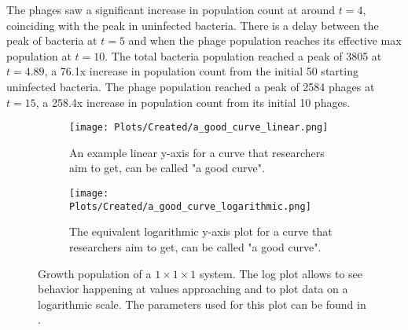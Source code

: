 The phages saw a significant increase in population count at around $t=4$, coinciding with the peak in uninfected bacteria. 
There is a delay between the peak of bacteria at $t=5$ and when the phage population reaches its effective max population at $t=10$. 
The total bacteria population reached a peak of 3805 at $t=4.89$, a 76.1x increase in population count from the initial 50 starting uninfected bacteria. 
The phage population reached a peak of 2584 phages at $t=15$, a 258.4x increase in population count from its initial 10 phages. 
\begin{figure}[h!]
    \centering
    \begin{subfigure}{1\linewidth}
        \centering
        \captionsetup{width=1\linewidth}
        \texttt{[image: Plots/Created/a\_good\_curve\_linear.png]}
        \caption{
            An example linear y-axis for a curve that researchers aim to get, can be called "a good curve". 
        }
        \label{fig:created:a_good_curve_linear}
    \end{subfigure}
    \hfill
    \begin{subfigure}{1\linewidth}
        \centering
        \captionsetup{width=1\linewidth}
        \texttt{[image: Plots/Created/a\_good\_curve\_logarithmic.png]}
        \caption{
            The equivalent logarithmic y-axis plot for a curve that researchers aim to get, can be called "a good curve". 
        }
        \label{fig:created:a_good_curve_logarithmic}
    \end{subfigure}
    \caption{
        Growth population of a $1\times1\times1$ system. 
        The log plot allows to see behavior happening at values approaching and to plot data on a logarithmic scale. 
        The parameters used for this plot can be found in . 
    }
    \label{fig:created:a_good_curve}
\end{figure}